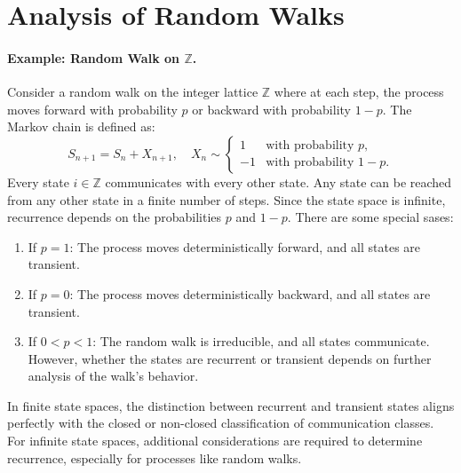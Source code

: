\section{Analysis of Random Walks}
\paragraph{Example: Random Walk on \( \mathbb{Z} \).}  
Consider a random walk on the integer lattice \( \mathbb{Z} \) where at each step, the process moves forward with probability \( p \) or backward with probability \( 1-p \).  \newline
The Markov chain is defined as:  
\[
S_{n+1} = S_n + X_{n+1}, \quad X_n \sim \begin{cases} 
1 & \text{with probability } p, \\ 
-1 & \text{with probability } 1-p. 
\end{cases}
\]  
Every state \( i \in \mathbb{Z} \) communicates with every other state. Any state can be reached from any other state in a finite number of steps. Since the state space is infinite, recurrence depends on the probabilities \( p \) and \( 1-p \). There are some special sases: 
\begin{enumerate}
    \item If \( p = 1 \): The process moves deterministically forward, and all states are transient.
    \item If \( p = 0 \): The process moves deterministically backward, and all states are transient.
    \item If \( 0 < p < 1 \): The random walk is irreducible, and all states communicate. However, whether the states are recurrent or transient depends on further analysis of the walk's behavior.
\end{enumerate}
In finite state spaces, the distinction between recurrent and transient states aligns perfectly with the closed or non-closed classification of communication classes. For infinite state spaces, additional considerations are required to determine recurrence, especially for processes like random walks.

